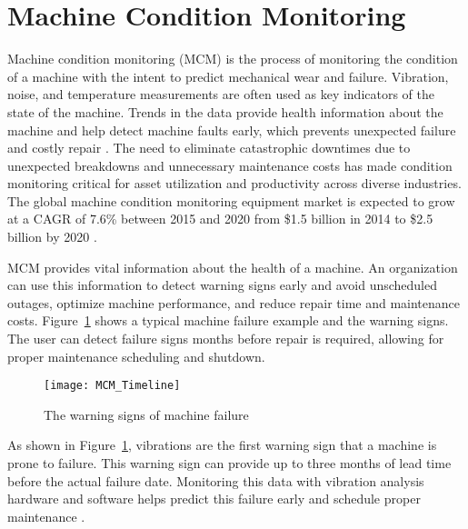\section{Machine Condition Monitoring}

Machine condition monitoring (MCM) is the process of monitoring the condition of a machine with the intent to predict mechanical wear and failure. Vibration, noise, and temperature measurements are often used as key indicators of the state of the machine. 
Trends in the data provide health information about the machine and help detect machine faults early, which prevents unexpected failure and costly repair \cite{MCMHandbook}. %
The need to eliminate catastrophic downtimes due to unexpected breakdowns and unnecessary maintenance costs has made condition monitoring critical for asset utilization and productivity across diverse industries.
The global machine condition monitoring equipment market is expected to grow at a CAGR of 7.6\% between 2015 and 2020 from \$1.5 billion in 2014 to \$2.5 billion by 2020 \cite{ResarchandMarkets15}.

MCM provides vital information about the health of a machine. An organization can use this information to detect warning signs early and avoid unscheduled outages, optimize machine performance, and reduce repair time and maintenance costs. Figure~\ref{fig:MCM_Timeline}  shows a typical machine failure example and the warning signs. The user can detect failure signs months before repair is required, allowing for proper maintenance scheduling and shutdown.

\begin{figure}[ht!]
    \centering
    \texttt{[image: MCM\_Timeline]}
    \caption{The warning signs of machine failure}
    \label{fig:MCM_Timeline}
\end{figure}

As shown in Figure~\ref{fig:MCM_Timeline}, vibrations are the first warning sign that a machine is prone to failure. This warning sign can provide up to three months of lead time before the actual failure date. Monitoring this data with vibration analysis hardware and software helps predict this failure early and schedule proper maintenance \cite{Randall_VibrationbasedCM}. 

